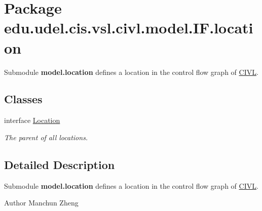 \hypertarget{namespaceedu_1_1udel_1_1cis_1_1vsl_1_1civl_1_1model_1_1IF_1_1location}{}\section{Package edu.\+udel.\+cis.\+vsl.\+civl.\+model.\+I\+F.\+location}
\label{namespaceedu_1_1udel_1_1cis_1_1vsl_1_1civl_1_1model_1_1IF_1_1location}


Submodule {\bfseries model.\+location} defines a location in the control flow graph of \hyperlink{classedu_1_1udel_1_1cis_1_1vsl_1_1civl_1_1CIVL}{C\+I\+V\+L}.  


\subsection*{Classes}
\begin{DoxyCompactItemize}
\item 
interface \hyperlink{interfaceedu_1_1udel_1_1cis_1_1vsl_1_1civl_1_1model_1_1IF_1_1location_1_1Location}{Location}
\begin{DoxyCompactList}\small\item\em The parent of all locations. \end{DoxyCompactList}\end{DoxyCompactItemize}


\subsection{Detailed Description}
Submodule {\bfseries model.\+location} defines a location in the control flow graph of \hyperlink{classedu_1_1udel_1_1cis_1_1vsl_1_1civl_1_1CIVL}{C\+I\+V\+L}. 

\begin{DoxyAuthor}{Author}
Manchun Zheng 
\end{DoxyAuthor}

